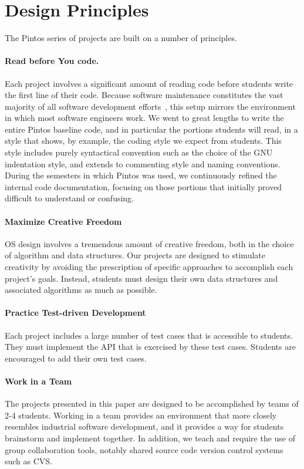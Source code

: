 \section{Design Principles}
\label{sec:designprinciples}

The Pintos series of projects are built on a number of principles.

\paragraph{Read before You code.}
Each project involves a significant amount of reading code before
students write the first line of their code.  
Because software maintenance constitutes the vast majority of all
software development efforts~\cite{Boehm1981Software}, this setup mirrors the 
environment in which most software engineers work.
We went to great lengths to write the entire Pintos baseline code,
and in particular the portions students will read, in a style that shows,
by example, the coding style we expect from students.  This style
includes purely syntactical convention such as the choice of the
GNU indentation style, and extends to commenting style and naming 
conventions.  During the semesters in which Pintos was used, we
continuously refined the internal code documentation, focusing on those 
portions that initially proved difficult to understand or confusing.

\paragraph{Maximize Creative Freedom}
OS design involves a tremendous amount of creative freedom, both in the
choice of algorithm and data structures.  Our projects are designed to
stimulate creativity by avoiding the prescription of specific approaches
to accomplish each project's goals.  Instead, students must design their
own data structures and associated algorithms as much as possible.

\paragraph{Practice Test-driven Development}
Each project includes a large number of test cases that is accessible
to students.  
They must implement the API that is exercised by these test cases.
Students are encouraged to add their own test cases.

\paragraph{Work in a Team}
The projects presented in this paper are designed to be accomplished by teams of 
2-4 students.  Working in a team provides an environment that more closely resembles
industrial software development, and it provides a way for students brainstorm and
implement together.  In addition, we teach and require the use of group collaboration tools,
notably shared source code version control systems such as CVS.


